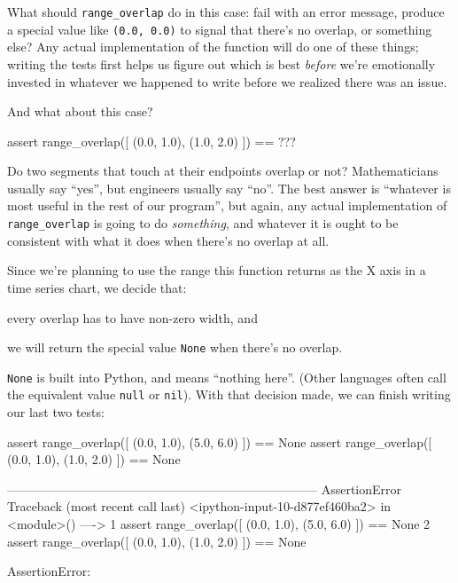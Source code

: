 \documentclass{book}
\begin{document}
What should \texttt{range\_overlap} do in this case: fail with an error
message, produce a special value like \texttt{(0.0, 0.0)} to signal that
there's no overlap, or something else? Any actual implementation of the
function will do one of these things; writing the tests first helps us
figure out which is best \emph{before} we're emotionally invested in
whatever we happened to write before we realized there was an issue.

And what about this case?

\begin{VerbIn}
assert range_overlap([ (0.0, 1.0), (1.0, 2.0) ]) == ???
\end{VerbIn}

Do two segments that touch at their endpoints overlap or not?
Mathematicians usually say ``yes'', but engineers usually say ``no''.
The best answer is ``whatever is most useful in the rest of our
program'', but again, any actual implementation of
\texttt{range\_overlap} is going to do \emph{something}, and whatever it
is ought to be consistent with what it does when there's no overlap at
all.

Since we're planning to use the range this function returns as the X
axis in a time series chart, we decide that:

\begin{swcenumerate}
\item
  every overlap has to have non-zero width, and
\item
  we will return the special value \texttt{None} when there's no
  overlap.
\end{swcenumerate}

\texttt{None} is built into Python, and means ``nothing here''. (Other
languages often call the equivalent value \texttt{null} or
\texttt{nil}). With that decision made, we can finish writing our last
two tests:

\begin{VerbIn}
assert range_overlap([ (0.0, 1.0), (5.0, 6.0) ]) == None
assert range_overlap([ (0.0, 1.0), (1.0, 2.0) ]) == None
\end{VerbIn}

\begin{VerbErr}
---------------------------------------------------------------------------
AssertionError                            Traceback (most recent call last)
<ipython-input-10-d877ef460ba2> in <module>()
----> 1 assert range_overlap([ (0.0, 1.0), (5.0, 6.0) ]) == None
      2 assert range_overlap([ (0.0, 1.0), (1.0, 2.0) ]) == None

AssertionError: 
\end{VerbErr}
\end{document}
